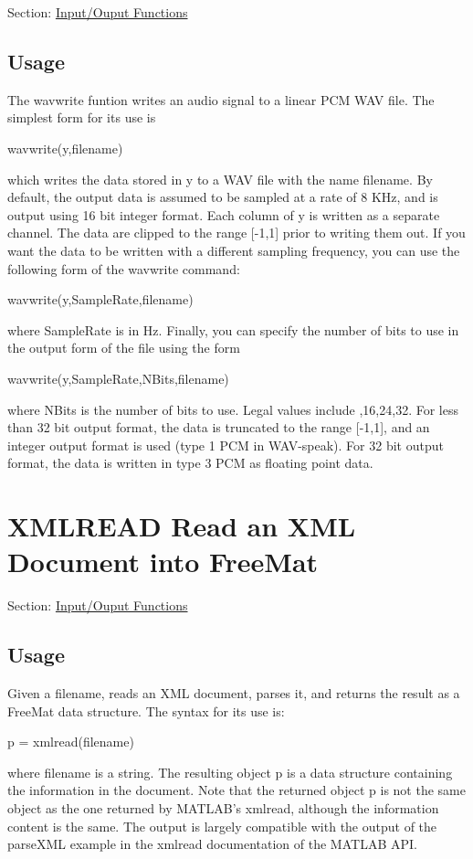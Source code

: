 Section\-: \hyperlink{sec_io}{Input/\-Ouput Functions} \hypertarget{vtkwidgets_vtkxyplotwidget_Usage}{}\subsection{Usage}\label{vtkwidgets_vtkxyplotwidget_Usage}
The {\ttfamily wavwrite} funtion writes an audio signal to a linear P\-C\-M W\-A\-V file. The simplest form for its use is \begin{DoxyVerb}    wavwrite(y,filename)
\end{DoxyVerb}
 which writes the data stored in {\ttfamily y} to a W\-A\-V file with the name {\ttfamily filename}. By default, the output data is assumed to be sampled at a rate of 8 K\-Hz, and is output using 16 bit integer format. Each column of {\ttfamily y} is written as a separate channel. The data are clipped to the range {\ttfamily \mbox{[}-\/1,1\mbox{]}} prior to writing them out. If you want the data to be written with a different sampling frequency, you can use the following form of the {\ttfamily wavwrite} command\-: \begin{DoxyVerb}   wavwrite(y,SampleRate,filename)
\end{DoxyVerb}
 where {\ttfamily Sample\-Rate} is in Hz. Finally, you can specify the number of bits to use in the output form of the file using the form \begin{DoxyVerb}   wavwrite(y,SampleRate,NBits,filename)
\end{DoxyVerb}
 where {\ttfamily N\-Bits} is the number of bits to use. Legal values include {,16,24,32}. For less than 32 bit output format, the data is truncated to the range {\ttfamily \mbox{[}-\/1,1\mbox{]}}, and an integer output format is used (type 1 P\-C\-M in W\-A\-V-\/speak). For 32 bit output format, the data is written in type 3 P\-C\-M as floating point data. \hypertarget{io_xmlread}{}\section{X\-M\-L\-R\-E\-A\-D Read an X\-M\-L Document into Free\-Mat}\label{io_xmlread}
Section\-: \hyperlink{sec_io}{Input/\-Ouput Functions} \hypertarget{vtkwidgets_vtkxyplotwidget_Usage}{}\subsection{Usage}\label{vtkwidgets_vtkxyplotwidget_Usage}
Given a filename, reads an X\-M\-L document, parses it, and returns the result as a Free\-Mat data structure. The syntax for its use is\-: \begin{DoxyVerb}   p = xmlread(filename)
\end{DoxyVerb}
 where {\ttfamily filename} is a {\ttfamily string}. The resulting object {\ttfamily p} is a data structure containing the information in the document. Note that the returned object {\ttfamily p} is not the same object as the one returned by M\-A\-T\-L\-A\-B's {\ttfamily xmlread}, although the information content is the same. The output is largely compatible with the output of the parse\-X\-M\-L example in the {\ttfamily xmlread} documentation of the M\-A\-T\-L\-A\-B A\-P\-I. 